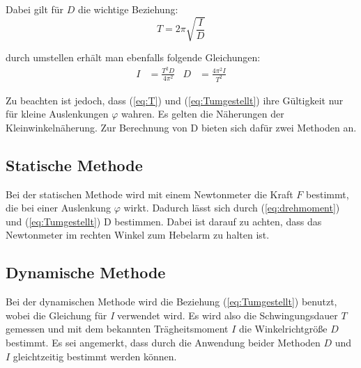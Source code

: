 Dabei gilt für $D$ die wichtige Beziehung:
\begin{equation} \label{eq:T}
    T = 2\pi \sqrt{\frac{I}{D}}
\end{equation}

durch umstellen erhält man ebenfalls folgende Gleichungen:
\begin{align} \label{eq:Tumgestellt}
    I & = \frac{T^2D}{4\pi^2} & D & = \frac{4\pi^2I}{T^2} 
\end{align}

Zu beachten ist jedoch, dass (\ref{eq:T}) und (\ref{eq:Tumgestellt}) ihre Gültigkeit nur für kleine Auslenkungen $\varphi$ wahren.
Es gelten die Näherungen der Kleinwinkelnäherung.
Zur Berechnung von D bieten sich dafür zwei Methoden an.

\subsection*{Statische Methode}
Bei der statischen Methode wird mit einem Newtonmeter die Kraft $F$ bestimmt, die bei einer Auslenkung $\varphi$ wirkt.
Dadurch lässt sich durch (\ref{eq:drehmoment}) und (\ref{eq:Tumgestellt}) D bestimmen.
Dabei ist darauf zu achten, dass das Newtonmeter im rechten Winkel zum Hebelarm zu halten ist.

\subsection*{Dynamische Methode}
Bei der dynamischen Methode wird die Beziehung (\ref{eq:Tumgestellt}) benutzt, wobei die Gleichung für \textit{I} verwendet wird.
Es wird also die Schwingungsdauer $T$ gemessen und mit dem bekannten Trägheitsmoment $I$ die Winkelrichtgröße $D$ bestimmt.
Es sei angemerkt, dass durch die Anwendung beider Methoden $D$ und $I$ gleichtzeitig bestimmt werden können.